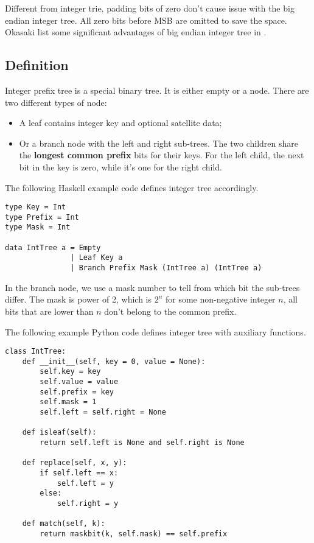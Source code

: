 \documentclass[b5paper]{article}
\begin{document}
Different from integer trie, padding bits of zero don't cause issue
with the big endian integer tree. All zero bits before MSB are omitted to
save the space. Okasaki list some significant advantages of big endian
integer tree in \cite{okasaki-int-map}.

\subsection{Definition}

Integer prefix tree is a special binary tree. It is either
empty or a node. There are two different types of node:

\begin{itemize}
\item A leaf contains integer key and optional satellite data;
\item Or a branch node with the left and right sub-trees. The
two children share the \textbf{longest common prefix} bits for their keys.
For the left child, the next bit in the key is zero, while it's one
for the right child.
\end{itemize}

The following Haskell example code defines integer tree accordingly.

\lstset{language=Haskell}
\begin{lstlisting}
type Key = Int
type Prefix = Int
type Mask = Int

data IntTree a = Empty
               | Leaf Key a
               | Branch Prefix Mask (IntTree a) (IntTree a)
\end{lstlisting}

In the branch node, we use a mask number to tell from which bit the sub-trees differ.
The mask is power of 2, which is $2^n$ for some non-negative integer $n$, all
bits that are lower than $n$ don't belong to the common prefix.

The following example Python code defines integer tree with auxiliary functions.

\lstset{language=Python}
\begin{lstlisting}
class IntTree:
    def __init__(self, key = 0, value = None):
        self.key = key
        self.value = value
        self.prefix = key
        self.mask = 1
        self.left = self.right = None

    def isleaf(self):
        return self.left is None and self.right is None

    def replace(self, x, y):
        if self.left == x:
            self.left = y
        else:
            self.right = y

    def match(self, k):
        return maskbit(k, self.mask) == self.prefix
\end{lstlisting}
\end{document}
